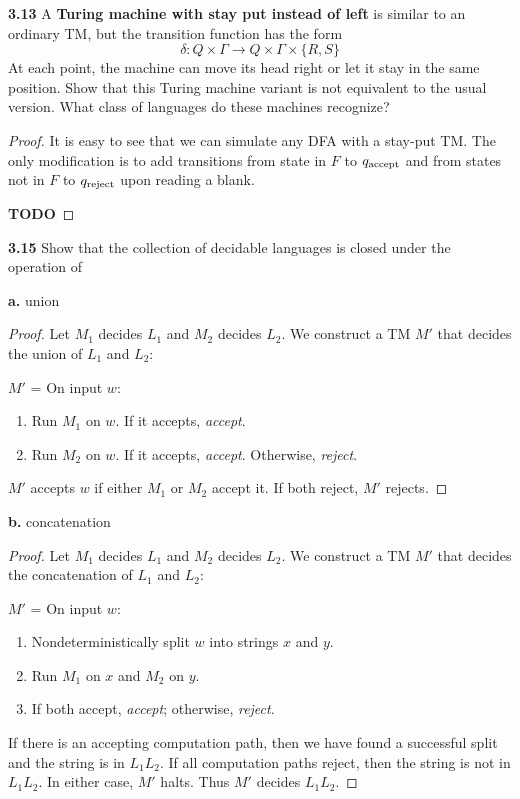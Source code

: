 \textbf{3.13} A \textbf{Turing machine with stay put instead of left} is similar to an ordinary TM, but the transition function has the form
\[
\delta: Q \times \Gamma \rightarrow Q \times \Gamma \times \{ R, S\}
\]
At each point, the machine can move its head right or let it stay in the same position. Show that this Turing machine variant is not equivalent to the usual version. What class of languages do these machines recognize?

\begin{mdframed}
\begin{proof}
It is easy to see that we can simulate any DFA with a stay-put TM. The only modification is to add transitions from state in $F$ to $q_{\text{accept}}$ and from states not in $F$ to $q_{\text{reject}}$ upon reading a blank.

\textbf{TODO}
\end{proof}
\end{mdframed}

\label{exe:DCDB_CLOSURE}
\textbf{3.15} Show that the collection of decidable languages is closed under the operation of 

\textbf{a.} union
\begin{mdframed}
\begin{proof}
Let $M_1$ decides $L_1$ and $M_2$ decides $L_2$. We construct a TM $M'$ that decides the union of $L_1$ and $L_2$:

$M'$ = On input $w$:
\begin{enumerate}
\item Run $M_1$ on $w$. If it accepts, \textit{accept}.
\item Run $M_2$ on $w$. If it accepts, \textit{accept}. Otherwise, \textit{reject}.
\end{enumerate}
$M'$ accepts $w$ if either $M_1$ or $M_2$ accept it. If both reject, $M'$ rejects.
\end{proof}
\end{mdframed}

\textbf{b.} concatenation

\begin{mdframed}
\begin{proof}
Let $M_1$ decides $L_1$ and $M_2$ decides $L_2$. We construct a TM $M'$ that decides the concatenation of $L_1$ and $L_2$:

$M'$ = On input $w$:
\begin{enumerate}
\item Nondeterministically split $w$ into strings $x$ and $y$.
\item Run $M_1$ on $x$ and $M_2$ on $y$.
\item If both accept, \textit{accept}; otherwise, \textit{reject}.
\end{enumerate}

If there is an accepting computation path, then we have found a successful split and the string is in $L_1L_2$. If all computation paths reject, then the string is not in $L_1L_2$. In either case, $M'$ halts. Thus $M'$ decides $L_1 L_2$.
\end{proof}
\end{mdframed}

